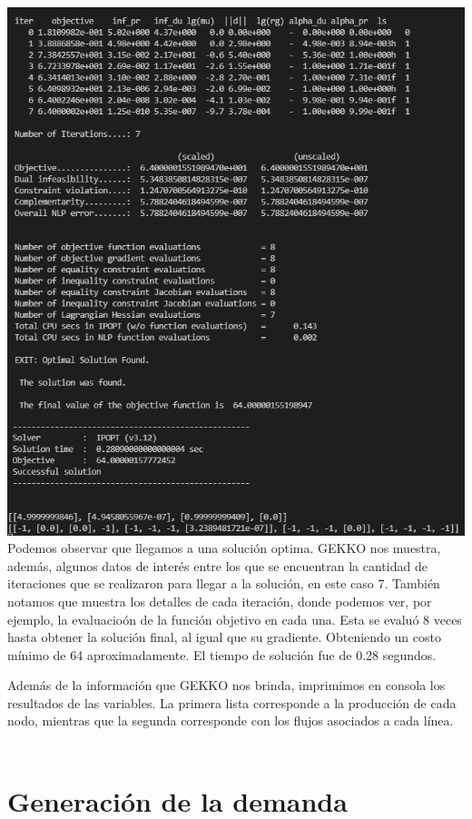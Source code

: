 \documentclass[twoside]{article}
\begin{document}
\begin{multicols}{2}
\includegraphics[scale = 0.35]{img/pic_2.png} \\

Podemos observar que llegamos a una soluci\'on optima. GEKKO nos muestra, adem\'as, algunos datos de inter\'es entre los que se encuentran la cantidad de iteraciones que se realizaron para llegar a la soluci\'on, en este caso 7. Tambi\'en notamos que muestra los detalles de cada iteraci\'on, donde podemos ver, por ejemplo, la evaluacio\'on de la funci\'on objetivo en cada una. Esta se evalu\'o 8 veces hasta obtener la soluci\'on final, al igual que su gradiente. Obteniendo un costo m\'inimo de 64 aproximadamente. El tiempo de soluci\'on fue de 0.28 segundos. 

Adem\'as de la informaci\'on que GEKKO nos brinda, imprimimos en consola los resultados de las variables. La primera lista corresponde a la producci\'on de cada nodo, mientras que la segunda corresponde con los flujos asociados a cada l\'inea. \\\\



\section{Generaci\'on de la demanda}


\end{multicols}
\end{document}
